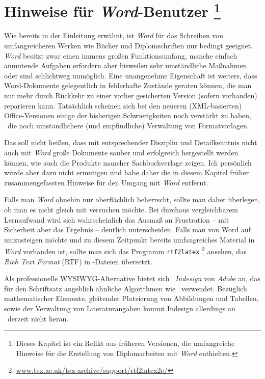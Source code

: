 \chapter[Hinweise für \emph{Word}-Benutzer]{Hinweise für \emph{Word}-Benutzer%
\protect\footnote{Dieses Kapitel ist ein Relikt aus früheren Versionen, die%
umfangreiche Hinweise für die Erstellung von Diplomarbeiten mit \emph{Word} enthielten.}%
}
\label{chap:Word}

Wie bereits in der Einleitung erwähnt, ist \emph{Word} für das
Schreiben von umfangreicheren Werken wie Bücher und
Diplomschriften nur bedingt geeignet. \emph{Word} besitzt zwar
einen immens großen Funktionsumfang,  manche einfach anmutende
Aufgaben erfordern aber bisweilen sehr umständliche Maßnahmen oder
sind schlichtweg unmöglich. Eine unangenehme Eigenschaft ist
weiters, dass Word-Dokumente gelegentlich in fehlerhafte Zustände
geraten können, die man nur mehr durch Rückkehr zu einer vorher
gesicherten Version (sofern vorhanden) reparieren kann. 
Tatsächlich scheinen sich bei den neueren
(XML-basierten) Office-Versionen einige der bisherigen
Schwierigkeiten noch verstärkt zu haben, \zB\ die noch
umständlichere (und empfindliche) Verwaltung von Formatvorlagen.

Das soll nicht heißen, dass mit entsprechender Disziplin und Detailkenntnis
nicht auch mit \emph{Word} große Dokumente sauber und erfolgreich hergestellt
werden können, wie auch die Produkte mancher Sachbuchverlage zeigen. Ich persönlich würde aber dazu nicht ermutigen und habe daher die in diesem Kapitel früher zusammengefassten Hinweise für den Umgang mit \emph{Word} entfernt.


Falls man \emph{Word} ohnehin
nur oberflächlich beherrscht, sollte man daher überlegen, ob man es
nicht gleich mit \latex versuchen möchte. 
Bei durchaus vergleichbarem Lernaufwand wird sich wahrscheinlich
das Ausmaß an Frustration -- mit Sicherheit aber das Ergebnis -- 
deutlich unterscheiden.
Falls man von Word 
auf \latex umzusteigen möchte und zu diesem Zeitpunkt bereits
umfangreiches Material in \emph{Word} vorhanden ist, sollte man sich das
Programm \texttt{rtf2latex}%
\footnote{\zB \url{www.tex.ac.uk/tex-archive/support/rtf2latex2e/}}
ansehen, das \emph{Rich Text Format} (RTF) in \latex-Dateien übersetzt.


Als professionelle WYSIWYG-Alternative bietet sich \zB\ \emph{Indesign} von \emph{Adobe} an, das für den Schriftsatz angeblich ähnliche Algorithmen wie \latex\ verwendet. Bezüglich mathematischer Elemente, gleitender Platzierung von Abbildungen und Tabellen, sowie der Verwaltung von Literaturangaben kommt Indesign allerdings an \latex\ derzeit nicht heran.
